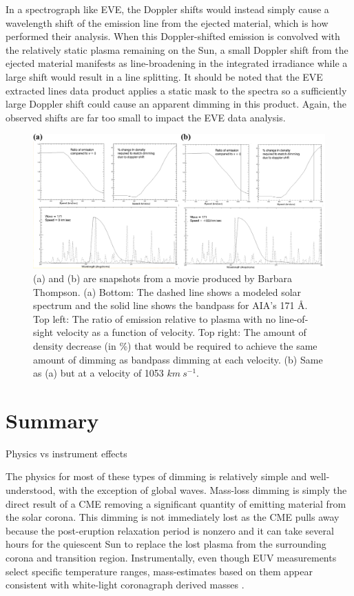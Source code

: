 In a spectrograph like EVE, the Doppler shifts would instead simply cause a wavelength shift of the emission line from the ejected material, which is how \citet{Hudson2011} performed their analysis. When this Doppler-shifted emission is convolved with the relatively static plasma remaining on the Sun, a small Doppler shift from the ejected material manifests as line-broadening in the integrated irradiance while a large shift would result in a line splitting. It should be noted that the EVE extracted lines data product applies a static mask to the spectra so a sufficiently large Doppler shift could cause an apparent dimming in this product. Again, the observed shifts are far too small to impact the EVE data analysis.

\begin{figure}[!h]
    \caption[Bandpass dimming]{
        (a) and (b) are snapshots from a movie produced by Barbara Thompson. 
        (a) Bottom: The dashed line shows a modeled solar spectrum and the solid line shows the bandpass for AIA's 171 \AA. 
        Top left: The ratio of emission relative to plasma with no line-of-sight velocity as a function of velocity. 
        Top right: The amount of density decrease (in \%) that would be required to achieve the same amount of dimming as 
        bandpass dimming at each velocity. 
        (b) Same as (a) but at a velocity of 1053 $km\ s^{-1}$. 
    }
    \begin{center}
        \includegraphics[width=166mm]{Images/BandpassDimming.png}
    \end{center}
    \label{bandpassDimming}
\end{figure}

\section{Summary}
Physics vs instrument effects

The physics for most of these types of dimming is relatively simple and well-understood, with the exception of global waves. Mass-loss dimming is simply the direct result of a CME removing a significant quantity of emitting material from the solar corona. This dimming is not immediately lost as the CME pulls away because the post-eruption relaxation period is nonzero and it can take several hours for the quiescent Sun to replace the lost plasma from the surrounding corona and transition region. Instrumentally, even though EUV measurements select specific temperature ranges, mass-estimates based on them appear consistent with white-light coronagraph derived masses \citep{Aschwanden2009}. 

